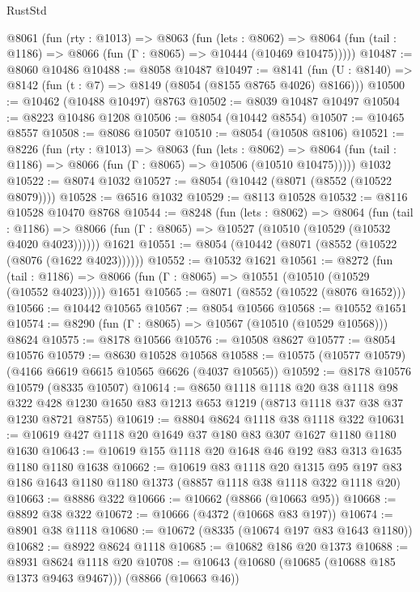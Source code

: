 \begin{lexlean}{RustStd}
\begin{coremodule}
  @8061
    (fun (rty : @1013) =>
    @8063
      (fun (lets : @8062) =>
      @8064 (fun (tail : @1186) => @8066 (fun (Γ : @8065) => @10444 (@10469 @10475)))))
@10487 := @8060 @10486
@10488 := @8058 @10487
@10497 := @8141 (fun (U : @8140) => @8142 (fun (t : @7) => @8149 (@8054 (@8155 @8765 @4026) @8166)))
@10500 := @10462 (@10488 @10497) @8763
@10502 := @8039 @10487 @10497
@10504 := @8223 @10486 @1208
@10506 := @8054 (@10442 @8554)
@10507 := @10465 @8557
@10508 := @8086 @10507
@10510 := @8054 (@10508 @8106)
@10521 := @8226
    (fun (rty : @1013) =>
    @8063
      (fun (lets : @8062) =>
      @8064 (fun (tail : @1186) => @8066 (fun (Γ : @8065) => @10506 (@10510 @10475)))))
    @1032
@10522 := @8074 @1032
@10527 := @8054 (@10442 (@8071 (@8552 (@10522 @8079))))
@10528 := @6516 @1032
@10529 := @8113 @10528
@10532 := @8116 @10528 @10470 @8768
@10544 := @8248
    (fun (lets : @8062) =>
    @8064
      (fun (tail : @1186) =>
      @8066 (fun (Γ : @8065) => @10527 (@10510 (@10529 (@10532 @4020 @4023))))))
    @1621
@10551 := @8054 (@10442 (@8071 (@8552 (@10522 (@8076 (@1622 @4023))))))
@10552 := @10532 @1621
@10561 := @8272
    (fun (tail : @1186) => @8066 (fun (Γ : @8065) => @10551 (@10510 (@10529 (@10552 @4023)))))
    @1651
@10565 := @8071 (@8552 (@10522 (@8076 @1652)))
@10566 := @10442 @10565
@10567 := @8054 @10566
@10568 := @10552 @1651
@10574 := @8290 (fun (Γ : @8065) => @10567 (@10510 (@10529 @10568))) @8624
@10575 := @8178 @10566
@10576 := @10508 @8627
@10577 := @8054 @10576
@10579 := @8630 @10528 @10568
@10588 := @10575 (@10577 @10579) (@4166 @6619 @6615 @10565 @6626 (@4037 @10565))
@10592 := @8178 @10576 @10579 (@8335 @10507)
@10614 := @8650
    @1118
    @1118
    @20
    @38
    @1118
    @98
    @322
    @428
    @1230
    @1650
    @83
    @1213
    @653
    @1219
    (@8713 @1118 @37 @38 @37 @1230 @8721 @8755)
@10619 := @8804 @8624 @1118 @38 @1118 @322
@10631 := @10619 @427 @1118 @20 @1649 @37 @180 @83 @307 @1627 @1180 @1180 @1630
@10643 := @10619 @155 @1118 @20 @1648 @46 @192 @83 @313 @1635 @1180 @1180 @1638
@10662 := @10619
    @83
    @1118
    @20
    @1315
    @95
    @197
    @83
    @186
    @1643
    @1180
    @1180
    @1373
    (@8857 @1118 @38 @1118 @322 @1118 @20)
@10663 := @8886 @322
@10666 := @10662 (@8866 (@10663 @95))
@10668 := @8892 @38 @322
@10672 := @10666 (@4372 (@10668 @83 @197))
@10674 := @8901 @38 @1118
@10680 := @10672 (@8335 (@10674 @197 @83 @1643 @1180))
@10682 := @8922 @8624 @1118
@10685 := @10682 @186 @20 @1373
@10688 := @8931 @8624 @1118 @20
@10708 := @10643
    (@10680 (@10685 (@10688 @185 @1373 @9463 @9467)))
    (@8866 (@10663 @46))

\end{coremodule}
\end{lexlean}
